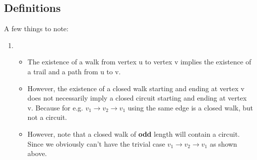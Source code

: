 \documentclass{article}
\begin{document}
\subsection{Definitions}
A few things to note:
\begin{enumerate}
	\item \begin{itemize}
		\item The existence of a walk from vertex u to vertex v implies the existence of a trail and a path from u to v. 
		\item However, the existence of a closed walk starting and ending at vertex v does not necessarily imply a closed circuit starting and ending at vertex v. Because for e.g. $v_1 \rightarrow v_2 \rightarrow v_1$ using the same edge is a closed walk, but not a circuit.
		\item However, note that a closed walk of \textbf{odd} length will contain a circuit. Since we obviously can't have the trivial case $v_1 \rightarrow v_2 \rightarrow v_1$ as shown above.
	\end{itemize}
\end{enumerate}
\end{document}
